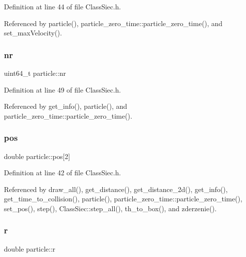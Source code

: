 Definition at line 44 of file Class\+Siec.\+h.



Referenced by particle(), particle\+\_\+zero\+\_\+time\+::particle\+\_\+zero\+\_\+time(), and set\+\_\+max\+Velocity().

\mbox{\label{structparticle_a055d478842e85c5f730fc75f16254852}} 
\subsubsection{\texorpdfstring{nr}{nr}}
{\footnotesize\ttfamily uint64\+\_\+t particle\+::nr}



Definition at line 49 of file Class\+Siec.\+h.



Referenced by get\+\_\+info(), particle(), and particle\+\_\+zero\+\_\+time\+::particle\+\_\+zero\+\_\+time().

\mbox{\label{structparticle_a9ba2ff9e556c82ec96f56ce659c1ad50}} 
\subsubsection{\texorpdfstring{pos}{pos}}
{\footnotesize\ttfamily double particle\+::pos\mbox{[}2\mbox{]}}



Definition at line 42 of file Class\+Siec.\+h.



Referenced by draw\+\_\+all(), get\+\_\+distance(), get\+\_\+distance\+\_\+2d(), get\+\_\+info(), get\+\_\+time\+\_\+to\+\_\+collision(), particle(), particle\+\_\+zero\+\_\+time\+::particle\+\_\+zero\+\_\+time(), set\+\_\+pos(), step(), Class\+Siec\+::step\+\_\+all(), th\+\_\+to\+\_\+box(), and zderzenie().

\mbox{\label{structparticle_a9ba64d6fa0d4bda34688d54a05341b77}} 
\subsubsection{\texorpdfstring{r}{r}}
{\footnotesize\ttfamily double particle\+::r}



